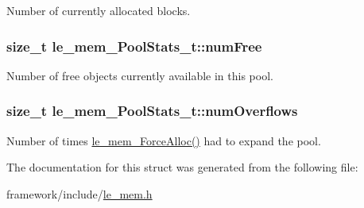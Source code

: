 Number of currently allocated blocks. 

\subsubsection[{\texorpdfstring{num\+Free}{numFree}}]{\setlength{\rightskip}{0pt plus 5cm}size\+\_\+t le\+\_\+mem\+\_\+\+Pool\+Stats\+\_\+t\+::num\+Free}\hypertarget{structle__mem___pool_stats__t_adbc69b9f0b2b6719fdb9f40e29688381}{}\label{structle__mem___pool_stats__t_adbc69b9f0b2b6719fdb9f40e29688381}


Number of free objects currently available in this pool. 

\subsubsection[{\texorpdfstring{num\+Overflows}{numOverflows}}]{\setlength{\rightskip}{0pt plus 5cm}size\+\_\+t le\+\_\+mem\+\_\+\+Pool\+Stats\+\_\+t\+::num\+Overflows}\hypertarget{structle__mem___pool_stats__t_ae60202bce92af5ecb9b0f4a2312be7ec}{}\label{structle__mem___pool_stats__t_ae60202bce92af5ecb9b0f4a2312be7ec}


Number of times \hyperlink{le__mem_8h_af7c289c73d4182835a26a9099f3db359}{le\+\_\+mem\+\_\+\+Force\+Alloc()} had to expand the pool. 



The documentation for this struct was generated from the following file\+:\begin{DoxyCompactItemize}
\item 
framework/include/\hyperlink{le__mem_8h}{le\+\_\+mem.\+h}\end{DoxyCompactItemize}
